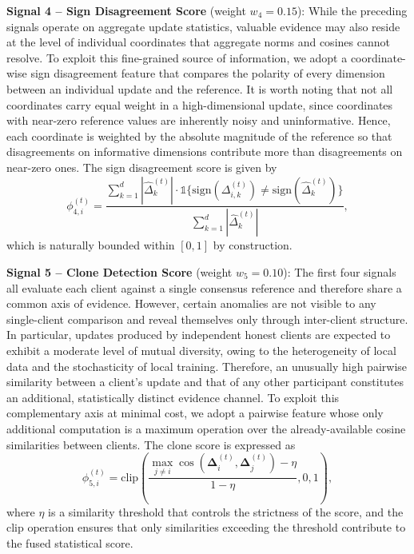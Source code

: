 \textbf{Signal 4 -- Sign Disagreement Score} (weight $w_4 = 0.15$): While the preceding signals operate on aggregate update statistics, valuable evidence may also reside at the level of individual coordinates that aggregate norms and cosines cannot resolve. To exploit this fine-grained source of information, we adopt a coordinate-wise sign disagreement feature that compares the polarity of every dimension between an individual update and the reference. It is worth noting that not all coordinates carry equal weight in a high-dimensional update, since coordinates with near-zero reference values are inherently noisy and uninformative. Hence, each coordinate is weighted by the absolute magnitude of the reference so that disagreements on informative dimensions contribute more than disagreements on near-zero ones. The sign disagreement score is given by
\begin{equation}\label{eq:sign_score}
    \phi_{4,i}^{(t)} = \frac{\sum_{k=1}^{d} |\hat{\Delta}_k^{(t)}| \cdot \mathbb{1}\{\text{sign}(\Delta_{i,k}^{(t)}) \neq \text{sign}(\hat{\Delta}_k^{(t)})\}}{\sum_{k=1}^{d} |\hat{\Delta}_k^{(t)}|},
\end{equation}
which is naturally bounded within $[0, 1]$ by construction.

\textbf{Signal 5 -- Clone Detection Score} (weight $w_5 = 0.10$): The first four signals all evaluate each client against a single consensus reference and therefore share a common axis of evidence. However, certain anomalies are not visible to any single-client comparison and reveal themselves only through inter-client structure. In particular, updates produced by independent honest clients are expected to exhibit a moderate level of mutual diversity, owing to the heterogeneity of local data and the stochasticity of local training. Therefore, an unusually high pairwise similarity between a client's update and that of any other participant constitutes an additional, statistically distinct evidence channel. To exploit this complementary axis at minimal cost, we adopt a pairwise feature whose only additional computation is a maximum operation over the already-available cosine similarities between clients. The clone score is expressed as
\begin{equation}\label{eq:clone_score}
    \phi_{5,i}^{(t)} = \text{clip}\left(\frac{\max_{j \neq i} \cos(\boldsymbol{\Delta}_i^{(t)}, \boldsymbol{\Delta}_j^{(t)}) - \eta}{1 - \eta}, 0, 1\right),
\end{equation}
where $\eta$ is a similarity threshold that controls the strictness of the score, and the clip operation ensures that only similarities exceeding the threshold contribute to the fused statistical score.

